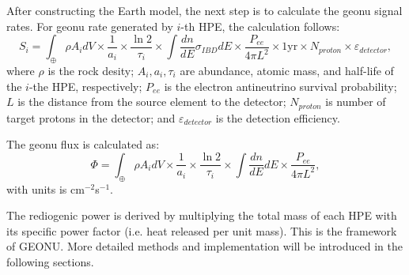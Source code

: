 			After constructing the Earth model, the next step is to calculate the geonu signal rates. For geonu rate generated by $i$-th HPE, the calculation follows:
				\begin{equation}
					S_i
					= \int_{\oplus} \rho A_i dV \times \frac{1}{a_i} \times \frac{\ln 2}{\tau_i}\times \int \frac{dn}{dE} \sigma_{IBD} dE \times \frac{P_{ee}}{4\pi L^2} \times 1 \text{yr} \times N_{proton} \times \varepsilon_{detector},
				\end{equation}
			where $\rho$ is the rock desity; $A_i, a_i, \tau_i$ are abundance, atomic mass, and half-life of the $i$-the HPE, respectively; $P_{ee}$ is the electron antineutrino survival probability; $L$ is the distance from the source element to the detector; $N_{proton}$ is number of target protons in the detector; and $\varepsilon_{detector}$ is the detection efficiency.\par
			The geonu flux is calculated as:
				\begin{equation}
					\Phi
					= \int_{\oplus} \rho A_i dV \times \frac{1}{a_i} \times \frac{\ln 2}{\tau_i}\times \int \frac{dn}{dE} dE \times \frac{P_{ee}}{4\pi L^2},
				\end{equation}
			with units is cm$^{-2}$s$^{-1}$.\par
			The rediogenic power is derived by multiplying the total mass of each HPE with its specific power factor (i.e. heat released per unit mass). This is the framework of GEONU. More detailed methods and implementation will be introduced in the following sections.
